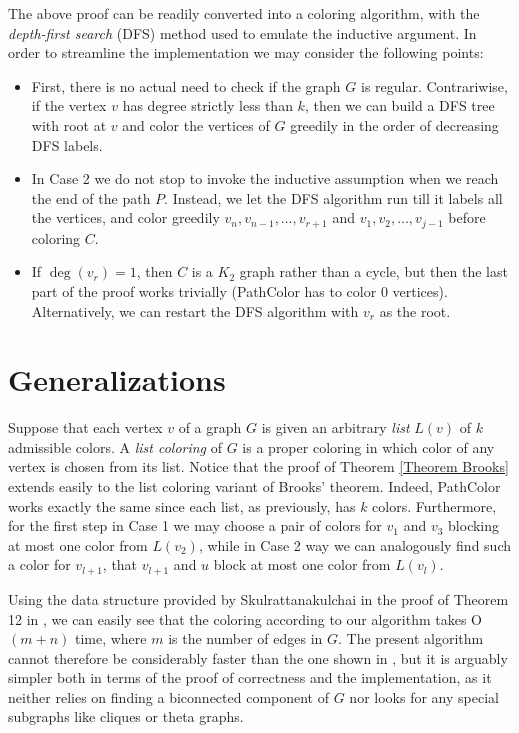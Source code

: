 \documentclass[12pt]{amsart}
\theoremstyle{plain}
\numberwithin{equation}{section}
\begin{document}
The above proof can be readily converted into a coloring algorithm, with the \emph{depth-first search} (DFS) method used to
emulate the inductive argument. In order to streamline the implementation we may consider the following points:
 
\begin{itemize}
\item 
First, there is no actual need to check if the graph $G$ is regular. Contrariwise, if the vertex $v$ has degree strictly less than $k$, then we
can build a DFS tree with root at $v$ and color the vertices of $G$ greedily in the order of decreasing DFS labels.

\item
In Case 2 we do not stop to invoke the inductive assumption when we reach the end of the path $P$. Instead, we
let the DFS algorithm run till it labels all the vertices, and color greedily $v_n,v_{n-1}, \dots, v_{r+1}$
and $v_1,v_2, \dots, v_{j-1}$ before coloring $C$.

\item
If $\deg(v_r)=1$, then $C$ is a $K_2$ graph rather than a cycle, but then the last part of the proof works 
trivially ({\sc PathColor} has to color 0 vertices). Alternatively, we can restart the DFS algorithm 
with $v_r$ as the root.
\end{itemize}

\section{Generalizations}

Suppose that each vertex $v$ of a graph $G$ is given an arbitrary \emph{list} $L(v)$ of $k$ admissible colors. A \emph{list coloring} \cite{ErdosRT} of $G$ is a proper coloring in which color of any vertex is chosen from its list. Notice that the proof of Theorem \ref{Theorem Brooks} extends easily to the list coloring variant of Brooks' theorem. Indeed, {\sc PathColor} works exactly the same since each list, as previously, has $k$ colors. Furthermore, for the first step in Case 1 we may choose a pair of colors for $v_1$ and $v_3$ blocking at most one color from $L(v_2)$, while in Case 2 way we can analogously find such a color for $v_{l+1}$, that $v_{l+1}$ and $u$ block at most one color from $L(v_l)$.

Using the data structure provided by Skulrattanakulchai in the proof of Theorem 12 in \cite{Sku}, we can easily see that the coloring according
to our algorithm takes O$(m+n)$ time, where $m$ is the number of edges in $G$. The present algorithm cannot therefore be considerably 
faster than the one shown in \cite{Sku}, but it is arguably simpler both in terms
of the proof of correctness and the implementation, as it neither relies on finding a biconnected component of $G$ nor looks 
for any special subgraphs like cliques or theta graphs. 
\end{document}
